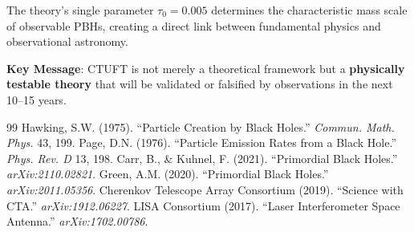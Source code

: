 The theory's single parameter $\tau_0 = 0.005$ determines the characteristic mass scale of observable PBHs, creating a direct link between fundamental physics and observational astronomy.

\textbf{Key Message}: CTUFT is not merely a theoretical framework but a \textbf{physically testable theory} that will be validated or falsified by observations in the next 10--15 years.

\begin{thebibliography}{99}
 Hawking, S.W. (1975). ``Particle Creation by Black Holes.'' \textit{Commun. Math. Phys.} 43, 199.
 Page, D.N. (1976). ``Particle Emission Rates from a Black Hole.'' \textit{Phys. Rev. D} 13, 198.
 Carr, B., \& Kuhnel, F. (2021). ``Primordial Black Holes.'' \textit{arXiv:2110.02821}.
 Green, A.M. (2020). ``Primordial Black Holes.'' \textit{arXiv:2011.05356}.
 Cherenkov Telescope Array Consortium (2019). ``Science with CTA.'' \textit{arXiv:1912.06227}.
 LISA Consortium (2017). ``Laser Interferometer Space Antenna.'' \textit{arXiv:1702.00786}.
\end{thebibliography}
